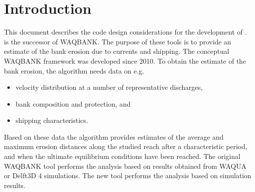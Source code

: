 \chapter{Introduction}

This document describes the code design considerations for the development of \dfastbe.
\dfastbe is the successor of WAQBANK.
The purpose of these tools is to provide an estimate of the bank erosion due to currents and shipping.
The conceptual WAQBANK framework was developed since 2010.
To obtain the estimate of the bank erosion, the algorithm needs data on e.g.

\begin{itemize}
\item velocity distribution at a number of representative discharges,
\item bank composition and protection, and
\item shipping characteristics.
\end{itemize}

Based on these data the algorithm provides estimates of the average and maximum erosion distances along the studied reach after a characteristic period, and when the ultimate equilibrium conditions have been reached.
The original WAQBANK tool performs the analysis based on results obtained from WAQUA or Delft3D 4 simulations.
The new \dfastbe tool performs the analysis based on \dflowfm simulation results.

